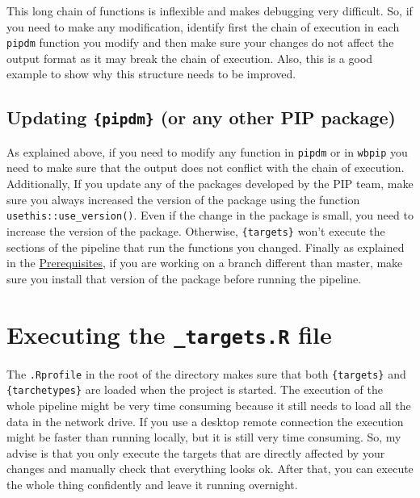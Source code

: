 \documentclass[
]{book}
\begin{document}
This long chain of functions is inflexible and makes debugging very difficult.
So, if you need to make any modification, identify first the chain of execution
in each \texttt{pipdm} function you modify and then make sure your changes do not
affect the output format as it may break the chain of execution. Also, this is a
good example to show why this structure needs to be improved.

\hypertarget{updating-pipdm-or-any-other-pip-package}{%
\subsection{\texorpdfstring{Updating \texttt{\{pipdm\}} (or any other PIP package)}{Updating \{pipdm\} (or any other PIP package)}}\label{updating-pipdm-or-any-other-pip-package}}

As explained above, if you need to modify any function in \texttt{pipdm} or in \texttt{wbpip}
you need to make sure that the output does not conflict with the chain of
execution. Additionally, If you update any of the packages developed by the PIP
team, make sure you always increased the version of the package using the
function \texttt{usethis::use\_version()}. Even if the change in the package is small,
you need to increase the version of the package. Otherwise, \texttt{\{targets\}} won't
execute the sections of the pipeline that run the functions you changed. Finally
as explained in the \protect\hyperlink{prerequisites-1}{Prerequisites}, if you are working on a branch different
than master, make sure you install that version of the package before running
the pipeline.

\hypertarget{executing-the-_targets.r-file}{%
\section{\texorpdfstring{Executing the \texttt{\_targets.R} file}{Executing the \_targets.R file}}\label{executing-the-_targets.r-file}}

The \texttt{.Rprofile} in the root of the directory makes sure that both \texttt{\{targets\}}
and \texttt{\{tarchetypes\}} are loaded when the project is started. The execution of the
whole pipeline might be very time consuming because it still needs to load all
the data in the network drive. If you use a desktop remote connection the
execution might be faster than running locally, but it is still very time
consuming. So, my advise is that you only execute the targets that are directly
affected by your changes and manually check that everything looks ok. After
that, you can execute the whole thing confidently and leave it running
overnight.
\end{document}
